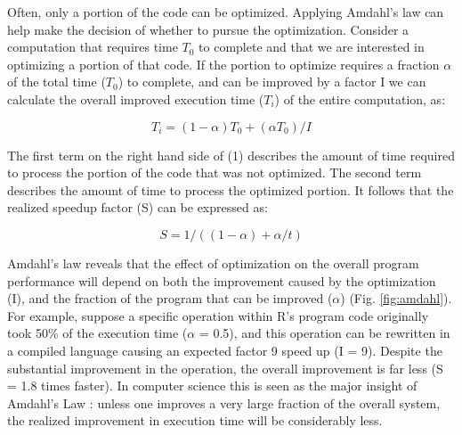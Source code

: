 \documentclass{article}\usepackage[]{graphicx}\usepackage[]{color}
\begin{document}
Often, only a portion of the code can be optimized. Applying Amdahl’s law \citep{Amdahl1967} can help make the decision of whether to pursue the optimization. Consider a computation that requires time $T_0$ to complete and that we are interested in optimizing a portion of that code. If the portion to optimize requires a fraction $\alpha$ of the total time ($T_0$) to complete, and can be improved by a factor I we can calculate the overall improved execution time ($T_i$) of the entire computation, as:

\begin{equation}
T_i=(1-\alpha) T_0+(\alpha T_0)/I					
\end{equation}

The first term on the right hand side of (1) describes the amount of time required to process the portion of the code that was not optimized. The second term describes the amount of time to process the optimized portion. It follows that the realized speedup factor (S) can be expressed as:

\begin{equation}
S=1 / (( 1 - \alpha )+ \alpha /t)
\end{equation} 		
			
Amdahl's law reveals that the effect of optimization on the overall program performance will depend on both the improvement caused by the optimization (I), and the fraction of the program that can be improved ($\alpha$) (Fig. \ref{fig:amdahl}).  For example, suppose a specific operation within R's program code originally took 50\% of the execution time ($\alpha$ = 0.5), and this operation can be rewritten in a compiled language causing an expected factor 9 speed up (I = 9).  Despite the substantial improvement in the operation, the overall improvement is far less (S = 1.8 times faster). In computer science this is seen as the major insight of Amdahl’s Law \citep{Bryant2010}: unless one improves a very large fraction of the overall system, the realized improvement in execution time will be considerably less. 
\end{document}
